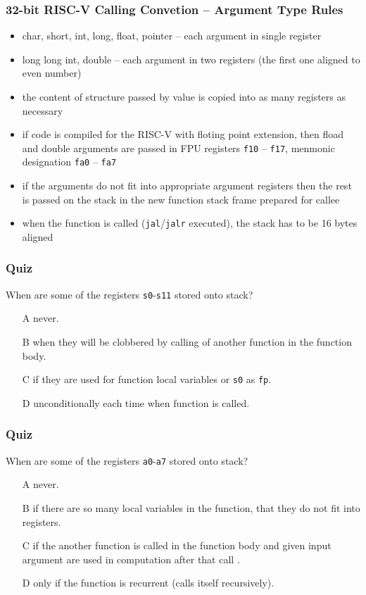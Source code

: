 \documentclass{beamer}
\begin{document}
\begin{frame}
\frametitle{32-bit RISC-V Calling Convetion -- Argument Type Rules}

\begin{itemize}
 \item char, short, int, long, float, pointer -- each argument in single register
 \item long long int, double -- each argument in two registers (the first one aligned to even number)
 \item the content of structure passed by value is copied into as many registers as necessary
 \item if code is compiled for the RISC-V with floting point extension, then fload and double arguments are passed in FPU registers \texttt{f10} -- \texttt{f17}, menmonic designation \texttt{fa0} -- \texttt{fa7}
 \item if the arguments do not fit into appropriate argument registers then the rest is passed on the stack in the new function stack frame prepared for callee
 \item when the function is called (\texttt{jal}/\texttt{jalr} executed), the stack has to be 16 bytes aligned
\end{itemize}
\end{frame}


\begin{frame}
\frametitle{Quiz}

When are some of the registers \texttt{s0}-\texttt{s11} stored onto stack?
\begin{itemize}
 \item[A] never.
 \item[B] when they will be clobbered by calling of another function in the function body.
 \item[C] if they are used for function local variables or \texttt{s0} as \texttt{fp}.
 \item[D] unconditionally each time when function is called.
\end{itemize}
\end{frame}


\begin{frame}
\frametitle{Quiz}

When are some of the registers \texttt{a0}-\texttt{a7} stored onto stack?
\begin{itemize}
 \item[A] never.
 \item[B] if there are so many local variables in the function, that they do not fit into registers.
 \item[C] if the another function is called in the function body and given input argument are used in computation after that call .
 \item[D] only if the function is recurrent (calls itself recursively).
\end{itemize}
\end{frame}
\end{document}
